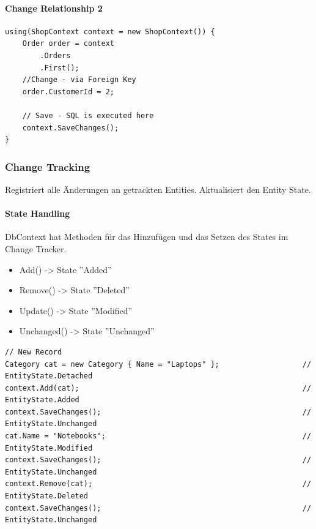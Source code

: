 \documentclass[
a4paper,
oneside,
10pt,
fleqn,
headsepline,
toc=listofnumbered, 
bibliography=totocnumbered]{scrartcl}
\begin{document}
\paragraph{Change Relationship 2}
\begin{lstlisting}
using(ShopContext context = new ShopContext()) {
    Order order = context
        .Orders
        .First();
    //Change - via Foreign Key
    order.CustomerId = 2;
    
    // Save - SQL is executed here
    context.SaveChanges();
}
\end{lstlisting}

\subsubsection{Change Tracking}
Registriert alle Änderungen an getrackten Entities. Aktualisiert den Entity State.
\paragraph{State Handling} DbContext hat Methoden für das Hinzufügen und das Setzen des States im Change Tracker.
\begin{itemize}
    \item Add() -> State ''Added''
    \item Remove() -> State ''Deleted''
    \item Update() -> State ''Modified''
    \item Unchanged() -> State ''Unchanged''
\end{itemize}
\begin{lstlisting}
// New Record
Category cat = new Category { Name = "Laptops" };                   // EntityState.Detached
context.Add(cat);                                                   // EntityState.Added
context.SaveChanges();                                              // EntityState.Unchanged
cat.Name = "Notebooks";                                             // EntityState.Modified
context.SaveChanges();                                              // EntityState.Unchanged
context.Remove(cat);                                                // EntityState.Deleted
context.SaveChanges();                                              // EntityState.Unchanged
\end{lstlisting}
\end{document}
